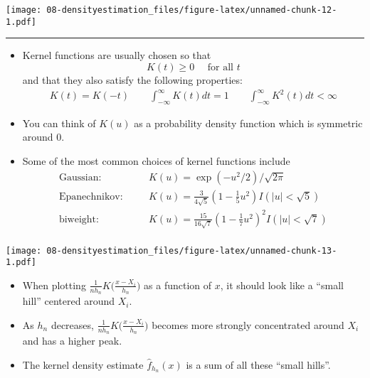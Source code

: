\documentclass[]{book}
\begin{document}
\texttt{[image: 08-densityestimation\_files/figure-latex/unnamed-chunk-12-1.pdf]}

\begin{center}\rule{0.5\linewidth}{\linethickness}\end{center}

\begin{itemize}
\item
  Kernel functions are usually chosen so that
  \begin{equation}
  K(t) \geq  0 \quad \textrm{ for all } t \nonumber 
  \end{equation}
  and that they also satisfy the following properties:
  \begin{eqnarray}
  K(t) = K(-t) \qquad 
  \int_{-\infty}^{\infty} K(t) dt = 1  \nonumber 
  \qquad 
  \int_{-\infty}^{\infty} K^{2}(t) dt  < \infty
  \nonumber
  \end{eqnarray}
\item
  You can think of \(K(u)\) as a probability density function
  which is symmetric around \(0\).
\item
  Some of the most common choices of kernel functions include
  \begin{eqnarray}
  \textrm{Gaussian} :&& \quad  K(u) = \exp(-u^{2}/2)/\sqrt{2\pi} \nonumber \\
  \textrm{Epanechnikov} :&& \quad  K(u) = \tfrac{3}{4\sqrt{5}}(1 - \tfrac{1}{5} u^{2}) I(|u| < \sqrt{5}) \nonumber \\
  \textrm{biweight} :&& \quad  K(u) = \tfrac{15}{16\sqrt{7}}(1 - \tfrac{1}{7} u^{2})^{2} I(|u| < \sqrt{7}) \nonumber \\
  \end{eqnarray}
\end{itemize}

\texttt{[image: 08-densityestimation\_files/figure-latex/unnamed-chunk-13-1.pdf]}

\begin{itemize}
\item
  When plotting \(\frac{1}{n h_{n}}K\big( \tfrac{x - X_{i}}{h_{n}} \big)\) as a function of \(x\), it should
  look like a ``small hill'' centered around \(X_{i}\).
\item
  As \(h_{n}\) decreases, \(\frac{1}{n h_{n}}K\big( \tfrac{x - X_{i}}{h_{n}} \big)\)
  becomes more strongly concentrated around \(X_{i}\) and has a higher peak.
\item
  The kernel density estimate \(\hat{f}_{h_{n}}(x)\) is a sum of all these ``small hills''.
\end{itemize}
\end{document}
